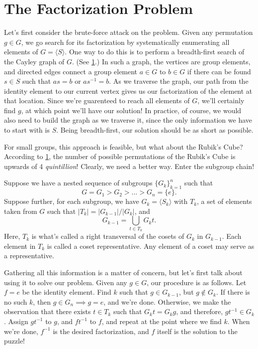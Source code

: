 \documentclass[12pt]{article}
\begin{document}
\section{The Factorization Problem}

Let's first consider the brute-force attack on the problem.  Given any permutation
$g\in G$, we go search for its factorization by systematically enumerating all
elements of $G=\langle S\rangle$.  One way to do this is to
perform a breadth-first search of the Cayley graph of $G$.  (See \ref{}.)  In such a graph,
the vertices are group elements, and directed edges connect a group
element $a\in G$ to $b\in G$ if there can be found $s\in S$ such
that $as=b$ or $as^{-1}=b$.  As we traverse the graph, our path
from the identity element to our current vertex gives us our
factorization of the element at that location.  Since we're guarenteed
to reach all elements of $G$, we'll certainly find $g$, at which
point we'll have our solution!  In practice, of course, we would also
need to build the graph as we traverse it, since the only information
we have to start with is $S$.  Being breadth-first, our solution should
be as short as possible.

For small groups, this approach is feasible, but what about the
Rubik's Cube?  According to \ref{}, the number of possible permutations
of the Rubik's Cube is upwards of 4 \textit{quintillion}!  Clearly, we need
a better way.  Enter the subgroup chain!

Suppose we have a nested sequence of subgroups $\{G_k\}_{k=1}^n$
such that
\begin{equation*}
G = G_1> G_2>\dots> G_n = \{e\}.
\end{equation*}
Suppose further, for each subgroup, we have $G_k=\langle S_k\rangle$
with $T_k$, a set of elements taken from $G$ such that
$|T_k|=|G_{k-1}|/|G_k|$, and
\begin{equation*}
G_{k-1} = \bigcup_{t\in T_k} G_kt.
\end{equation*}
Here, $T_k$ is what's called a right transversal of the cosets of $G_k$
in $G_{k-1}$.  Each element in $T_k$ is called a coset representative.
Any element of a coset may serve as a representative.

Gathering all this information is a matter of concern, but let's first talk about using it
to solve our problem.  Given any $g\in G$, our procedure is as follows.  Let $f=e$ be the identity element.
Find $k$ such that $g\in G_{k-1}$, but $g\not\in G_k$.  If there is no such $k$,
then $g\in G_n\implies g=e$, and we're done.  Otherwise, we make the observation
that there exists $t\in T_k$ such that $G_kt=G_kg$, and therefore, $gt^{-1}\in G_k$.
Assign $gt^{-1}$ to $g$, and $ft^{-1}$ to $f$, and repeat at the point where we find $k$.  When we're done,
$f^{-1}$ is the desired factorization, and $f$ itself is the solution to the puzzle!
\end{document}
